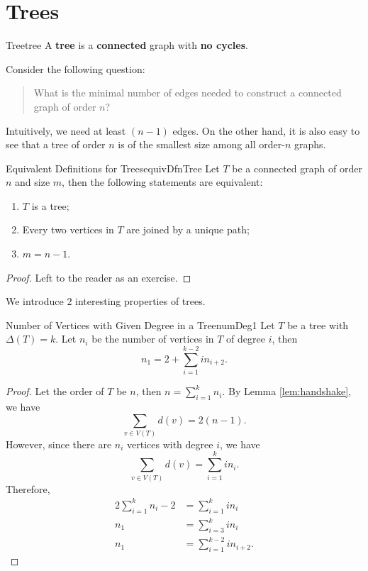 \documentclass[math]{amznotes}
\theoremstyle{remark}
\newcommand{\0}{\mathbf{0}}
\newcommand{\1}{\mathbf{1}}
\begin{document}
\section{Trees}
\begin{dfnbox}{Tree}{tree}
    A {\color{red} \textbf{tree}} is a {\color{red} \textbf{connected}} graph with {\color{red} \textbf{no cycles}}.
\end{dfnbox}
Consider the following question:
\begin{quote}
    What is the minimal number of edges needed to construct a connected graph of order $n$?
\end{quote}
Intuitively, we need at least $(n - 1)$ edges. On the other hand, it is also easy to see that a tree of order $n$ is of the smallest size among all order-$n$ graphs.
\begin{thmbox}{Equivalent Definitions for Trees}{equivDfnTree}
    Let $T$ be a connected graph of order $n$ and size $m$, then the following statements are equivalent:
    \begin{enumerate}
        \item $T$ is a tree;
        \item Every two vertices in $T$ are joined by a unique path;
        \item $m = n - 1$.
    \end{enumerate}
    \tcblower
    \begin{proof}
        Left to the reader as an exercise.
    \end{proof}
\end{thmbox}
We introduce $2$ interesting properties of trees.
\begin{probox}{Number of Vertices with Given Degree in a Tree}{numDeg1}
    Let $T$ be a tree with $\Delta(T) = k$. Let $n_i$ be the number of vertices in $T$ of degree $i$, then
    \begin{equation*}
        n_1 = 2 + \sum_{i = 1}^{k - 2}in_{i + 2}.
    \end{equation*}
    \tcblower
    \begin{proof}
        Let the order of $T$ be $n$, then $n = \sum_{i = 1}^{k}n_i$. By Lemma \ref{lem:handshake}, we have
        \begin{equation*}
            \sum_{v \in V(T)}d(v) = 2(n - 1).
        \end{equation*}
        However, since there are $n_i$ vertices with degree $i$, we have
        \begin{equation*}
            \sum_{v \in V(T)}d(v) = \sum_{i = 1}^{k}in_i.
        \end{equation*}
        Therefore,
        \begin{align*}
            2\sum_{i = 1}^{k}n_i - 2 & = \sum_{i = 1}^{k}in_i \\
            n_1 & = \sum_{i = 3}^{k}in_i \\
            n_1 & = \sum_{i = 1}^{k - 2}in_{i + 2}.
        \end{align*}
    \end{proof}
\end{probox}
\end{document}
